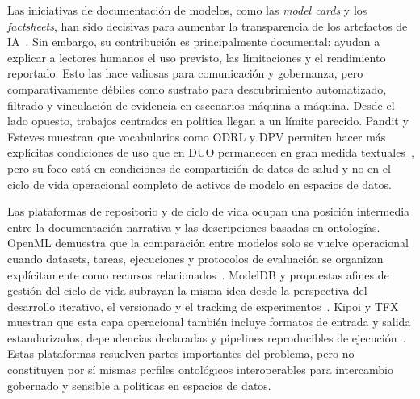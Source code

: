 \documentclass[11pt,a4paper]{article}
\begin{document}
Las iniciativas de documentación de modelos, como las \emph{model cards} y los \emph{factsheets}, han sido decisivas para aumentar la transparencia de los artefactos de IA~\cite{mitchell19,arnold19}. Sin embargo, su contribución es principalmente documental: ayudan a explicar a lectores humanos el uso previsto, las limitaciones y el rendimiento reportado. Esto las hace valiosas para comunicación y gobernanza, pero comparativamente débiles como sustrato para descubrimiento automatizado, filtrado y vinculación de evidencia en escenarios máquina a máquina. Desde el lado opuesto, trabajos centrados en política llegan a un límite parecido. Pandit y Esteves muestran que vocabularios como ODRL y DPV permiten hacer más explícitas condiciones de uso que en DUO permanecen en gran medida textuales~\cite{pandit-esteves}, pero su foco está en condiciones de compartición de datos de salud y no en el ciclo de vida operacional completo de activos de modelo en espacios de datos.

Las plataformas de repositorio y de ciclo de vida ocupan una posición intermedia entre la documentación narrativa y las descripciones basadas en ontologías. OpenML demuestra que la comparación entre modelos solo se vuelve operacional cuando datasets, tareas, ejecuciones y protocolos de evaluación se organizan explícitamente como recursos relacionados~\cite{openml}. ModelDB y propuestas afines de gestión del ciclo de vida subrayan la misma idea desde la perspectiva del desarrollo iterativo, el versionado y el tracking de experimentos~\cite{modeldb}. Kipoi y TFX muestran que esta capa operacional también incluye formatos de entrada y salida estandarizados, dependencias declaradas y pipelines reproducibles de ejecución~\cite{kipoi,tfx}. Estas plataformas resuelven partes importantes del problema, pero no constituyen por sí mismas perfiles ontológicos interoperables para intercambio gobernado y sensible a políticas en espacios de datos.
\end{document}
